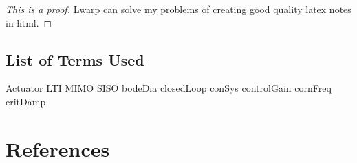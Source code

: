 \documentclass{scrreprt}
\theoremstyle{plain}
\theoremstyle{definition}
\theoremstyle{remark}
\begin{document}
\begin{proof}[This is a proof]
	Lwarp can solve my problems of creating good quality latex notes in html.
\end{proof}
\section*{List of Terms Used}
\gls{Actuator} \gls{LTI} \gls{MIMO} \gls{SISO} \gls{bodeDia} \gls{closedLoop} \gls{conSys} \gls{controlGain} \gls{cornFreq} \gls{critDamp} 


\chapter*{References}\label{references}
\end{document}
